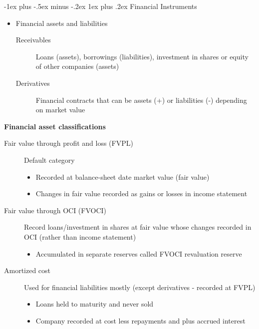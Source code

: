 \documentclass{article}
\makeatletter
\renewcommand{\subsubsection}{\@startsection{subsubsection}{3}{0mm}%
    {-1ex plus -.5ex minus -.2ex}%
    {1ex plus .2ex}%
{\normalfont\small\bfseries}}%
\makeatother
\begin{document}
\begin{multicols*}{3}
\subsubsection{Financial Instruments}
\begin{itemize}
	\item Financial assets and liabilities 
	\begin{description}
		\item[Receivables]{Loans (assets), borrowings (liabilities), investment in shares or equity of other companies (assets)}
		\item[Derivatives]{Financial contracts that can be assets (+) or liabilities (-) depending on market value}
	\end{description}
\end{itemize}
\textbf{Financial asset classifications}
\begin{description}
	\item[Fair value through profit and loss (FVPL)]{Default category}
	\begin{itemize}
		\item Recorded at balance-sheet date market value (fair value)
		\item Changes in fair value recorded as gains or losses in income statement
	\end{itemize}
	\item[Fair value through OCI (FVOCI)]{Record loans/investment in shares at fair value whose changes recorded in OCI (rather than income statement)}
	\begin{itemize}
		\item Accumulated in separate reserves called FVOCI revaluation reserve
	\end{itemize}
	\item[Amortized cost]{Used for financial liabilities mostly (except derivatives - recorded at FVPL)}
	\begin{itemize}
		\item Loans held to maturity and never sold
		\item Company recorded at cost less repayments and plus accrued interest
	\end{itemize}
\end{description}


\end{multicols*}
\end{document}
